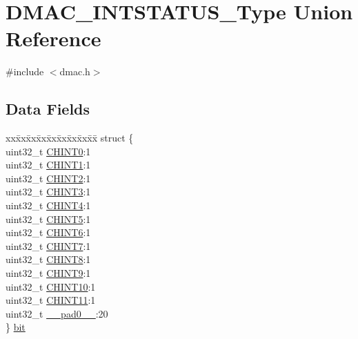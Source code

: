 \hypertarget{union_d_m_a_c___i_n_t_s_t_a_t_u_s___type}{}\section{D\+M\+A\+C\+\_\+\+I\+N\+T\+S\+T\+A\+T\+U\+S\+\_\+\+Type Union Reference}
\label{union_d_m_a_c___i_n_t_s_t_a_t_u_s___type}


{\ttfamily \#include $<$dmac.\+h$>$}

\subsection*{Data Fields}
\begin{DoxyCompactItemize}
\item 
\begin{tabbing}
xx\=xx\=xx\=xx\=xx\=xx\=xx\=xx\=xx\=\kill
struct \{\\
\>uint32\_t \mbox{\hyperlink{union_d_m_a_c___i_n_t_s_t_a_t_u_s___type_a72439fad9c513438333c64222aaaedda}{CHINT0}}:1\\
\>uint32\_t \mbox{\hyperlink{union_d_m_a_c___i_n_t_s_t_a_t_u_s___type_ad93a63a2ca13468a32b9b4a577a36f5f}{CHINT1}}:1\\
\>uint32\_t \mbox{\hyperlink{union_d_m_a_c___i_n_t_s_t_a_t_u_s___type_aa31fa484172c7235195e38b0789956da}{CHINT2}}:1\\
\>uint32\_t \mbox{\hyperlink{union_d_m_a_c___i_n_t_s_t_a_t_u_s___type_a1def28d6dc8db3901b1cc9b378f57c5a}{CHINT3}}:1\\
\>uint32\_t \mbox{\hyperlink{union_d_m_a_c___i_n_t_s_t_a_t_u_s___type_ad5d1614207d5afca3a1f9ff15ae14248}{CHINT4}}:1\\
\>uint32\_t \mbox{\hyperlink{union_d_m_a_c___i_n_t_s_t_a_t_u_s___type_a2657f6f47ac161ada38ef7c8a58bba0d}{CHINT5}}:1\\
\>uint32\_t \mbox{\hyperlink{union_d_m_a_c___i_n_t_s_t_a_t_u_s___type_aaeb07da3c47c2e2e448f1900b9ba0596}{CHINT6}}:1\\
\>uint32\_t \mbox{\hyperlink{union_d_m_a_c___i_n_t_s_t_a_t_u_s___type_a3049b694e4ed8db0937e2086c9c0f68e}{CHINT7}}:1\\
\>uint32\_t \mbox{\hyperlink{union_d_m_a_c___i_n_t_s_t_a_t_u_s___type_affb6a591e92fb5d2952ec53556d2b6f2}{CHINT8}}:1\\
\>uint32\_t \mbox{\hyperlink{union_d_m_a_c___i_n_t_s_t_a_t_u_s___type_ad25c28cc95048f60c0e3a1a6c8663658}{CHINT9}}:1\\
\>uint32\_t \mbox{\hyperlink{union_d_m_a_c___i_n_t_s_t_a_t_u_s___type_adc39008345d2d7931c647608e415843c}{CHINT10}}:1\\
\>uint32\_t \mbox{\hyperlink{union_d_m_a_c___i_n_t_s_t_a_t_u_s___type_a7ffaeb2a38153f9ceee2c34a9db9798a}{CHINT11}}:1\\
\>uint32\_t \mbox{\hyperlink{union_d_m_a_c___i_n_t_s_t_a_t_u_s___type_a3e57c2ef1c3ffb36722f000cc1156824}{\_\_pad0\_\_}}:20\\
\} \mbox{\hyperlink{union_d_m_a_c___i_n_t_s_t_a_t_u_s___type_ad2e05d8b223d59265369864b24cd0319}{bit}}\\


\end{tabbing}
\end{DoxyCompactItemize}
